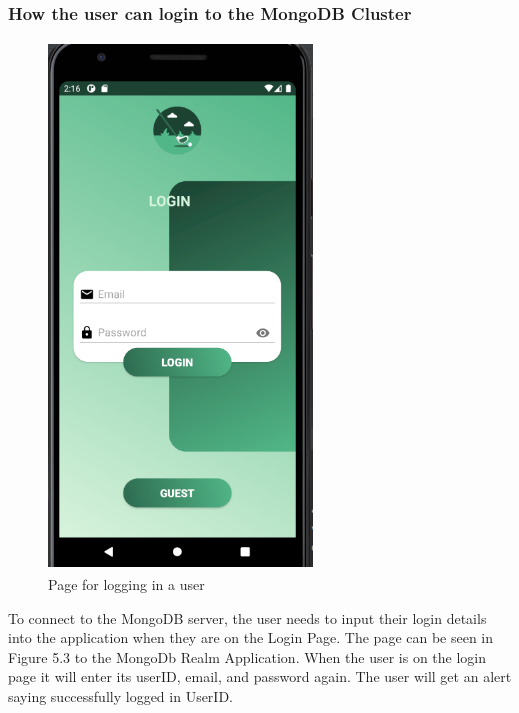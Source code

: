 \subsubsection{How the user can login to the MongoDB Cluster}
\begin{figure}[H]
    \centering
    \includegraphics[width=7cm, height = 14cm]{img/loginPage.PNG}
    \caption{Page for logging in a user}
    \label{fig:altas config}
\end{figure}
To connect to the MongoDB server, the user needs to input their login details into the application when they are on the Login Page. The page can be seen in Figure 5.3 to the MongoDb Realm Application. When the user is on the login page it will enter its userID, email, and password again. The user will get an alert saying successfully logged in UserID.

